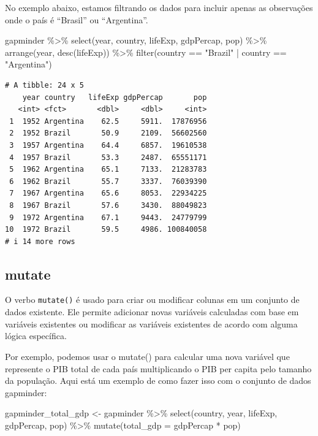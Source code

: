 \documentclass[
  portuguese,
  letterpaper,
  DIV=11,
  numbers=noendperiod]{scrreprt}
\newenvironment{Shaded}{\begin{snugshade}}{\end{snugshade}}
\newcommand{\AttributeTok}[1]{\textcolor[rgb]{0.40,0.45,0.13}{#1}}
\newcommand{\FunctionTok}[1]{\textcolor[rgb]{0.28,0.35,0.67}{#1}}
\newcommand{\NormalTok}[1]{\textcolor[rgb]{0.00,0.23,0.31}{#1}}
\newcommand{\OtherTok}[1]{\textcolor[rgb]{0.00,0.23,0.31}{#1}}
\newcommand{\SpecialCharTok}[1]{\textcolor[rgb]{0.37,0.37,0.37}{#1}}
\newcommand{\StringTok}[1]{\textcolor[rgb]{0.13,0.47,0.30}{#1}}
\theoremstyle{definition}
\theoremstyle{remark}
\begin{document}
No exemplo abaixo, estamos filtrando os dados para incluir apenas as
observações onde o país é ``Brasil'' ou ``Argentina''.

\begin{Shaded}
\begin{Highlighting}[]
\NormalTok{gapminder }\SpecialCharTok{\%\textgreater{}\%}
  \FunctionTok{select}\NormalTok{(year, country, lifeExp, gdpPercap, pop) }\SpecialCharTok{\%\textgreater{}\%}
  \FunctionTok{arrange}\NormalTok{(year, }\FunctionTok{desc}\NormalTok{(lifeExp)) }\SpecialCharTok{\%\textgreater{}\%} 
  \FunctionTok{filter}\NormalTok{(country }\SpecialCharTok{==} \StringTok{"Brazil"} \SpecialCharTok{|}\NormalTok{ country }\SpecialCharTok{==} \StringTok{"Argentina"}\NormalTok{)}
\end{Highlighting}
\end{Shaded}

\begin{verbatim}
# A tibble: 24 x 5
    year country   lifeExp gdpPercap       pop
   <int> <fct>       <dbl>     <dbl>     <int>
 1  1952 Argentina    62.5     5911.  17876956
 2  1952 Brazil       50.9     2109.  56602560
 3  1957 Argentina    64.4     6857.  19610538
 4  1957 Brazil       53.3     2487.  65551171
 5  1962 Argentina    65.1     7133.  21283783
 6  1962 Brazil       55.7     3337.  76039390
 7  1967 Argentina    65.6     8053.  22934225
 8  1967 Brazil       57.6     3430.  88049823
 9  1972 Argentina    67.1     9443.  24779799
10  1972 Brazil       59.5     4986. 100840058
# i 14 more rows
\end{verbatim}

\subsection{mutate}\label{mutate}

O verbo \texttt{mutate()} é usado para criar ou modificar colunas em um
conjunto de dados existente. Ele permite adicionar novas variáveis
calculadas com base em variáveis existentes ou modificar as variáveis
existentes de acordo com alguma lógica específica.

Por exemplo, podemos usar o mutate() para calcular uma nova variável que
represente o PIB total de cada país multiplicando o PIB per capita pelo
tamanho da população. Aqui está um exemplo de como fazer isso com o
conjunto de dados gapminder:

\begin{Shaded}
\begin{Highlighting}[]
\NormalTok{gapminder\_total\_gdp }\OtherTok{\textless{}{-}}\NormalTok{ gapminder }\SpecialCharTok{\%\textgreater{}\%}
  \FunctionTok{select}\NormalTok{(country, year, lifeExp, gdpPercap, pop) }\SpecialCharTok{\%\textgreater{}\%}
  \FunctionTok{mutate}\NormalTok{(}\AttributeTok{total\_gdp =}\NormalTok{ gdpPercap }\SpecialCharTok{*}\NormalTok{ pop)}
\end{Highlighting}
\end{Shaded}
\end{document}

